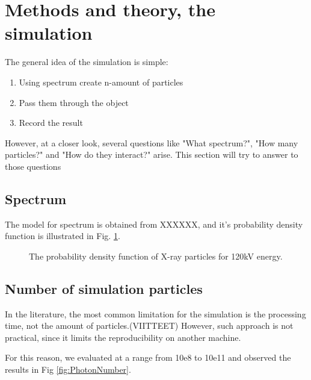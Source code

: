 \documentclass[fleqn,10pt]{SelfArx} %
\begin{document}



\section{Methods and theory, the simulation}


The general idea of the simulation is simple:
\begin{enumerate}[noitemsep]
\item Using spectrum create n-amount of particles
\item Pass them through the object
\item Record the result
\end{enumerate}

However, at a closer look, several questions like "What spectrum?", "How many particles?" and "How do they interact?" arise. This section will try to answer to those questions

\subsection{Spectrum}

The model for spectrum is obtained from XXXXXX, and it's probability density function is illustrated in Fig. \ref{fig:Spectrum}.

\begin{figure}[ht]\centering
\caption{The probability density function of X-ray particles for 120kV energy.}
\label{fig:Spectrum}
\end{figure}


\subsection{Number of simulation particles}

In the literature, the most common limitation for the simulation is the processing time, not the amount of particles.(VIITTEET) However, such approach is not practical, since it limits the reproducibility on another machine.

For this reason, we evaluated at a range from 10e8 to 10e11 and observed the results in Fig \ref{fig:PhotonNumber}. 
\end{document}
